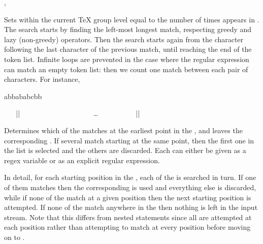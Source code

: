 \documentclass[oneside]{book}
\begin{document}
\begin{function}{\regexCount,\regexVarCount}
\begin{syntax}
   
   
\end{syntax}
Sets  within the current \TeX{} group level
equal to the number of times
 appears in .
The search starts by finding the left-most longest match,
respecting greedy and lazy (non-greedy) operators. Then the search
starts again from the character following the last character
of the previous match, until reaching the end of the token list.
Infinite loops are prevented in the case where the regular expression
can match an empty token list: then we count one match between each
pair of characters. For instance,
\begin{demohigh}
\intNew \lFooInt
{} {abbababcbb} \lFooInt
\intUse \lFooInt
\end{demohigh}
\end{function}

\begin{function}{\regexMatchCase}
\begin{syntax}
~ ~ |{|
~ ~ ~ ~  
~ ~ ~ ~  
~ ~ ~ ~ \ldots
~ ~ ~ ~  
~ ~ |}| 
\end{syntax}
Determines which of the  matches at the earliest
point in the , and leaves the corresponding .
If several  match starting at the same point,
then the first one in the list is selected and the others are discarded.
Each  can either be given as a regex variable or as an explicit
regular expression.
\par
In detail, for each starting position in the , each
of the  is searched in turn.  If one of them matches
then the corresponding  is used and everything else is
discarded, while if none of the  match at a given
position then the next starting position is attempted.  If none of
the  match anywhere in the  then
nothing is left in the input stream.  Note that this differs from
nested  statements since all  are
attempted at each position rather than attempting to match
 at every position before moving on to .
\end{function}
\end{document}
